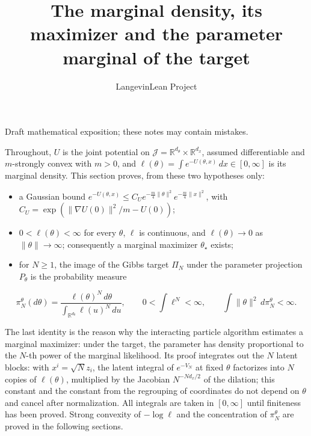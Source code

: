 \documentclass[11pt,a4paper]{article}
\title{\texorpdfstring{The marginal density, its maximizer and the parameter marginal of the target}{The marginal density, its maximizer and the parameter marginal of the target}}
\author{LangevinLean Project}
\date{}
\begin{document}
\maketitle
Draft mathematical exposition; these notes may contain mistakes.


Throughout, \(U\) is the joint potential on \(\mathcal J=\mathbb R^{d_\theta}\times\mathbb R^{d_x}\), assumed differentiable and \(m\)-strongly convex with \(m>0\), and \(\ell(\theta)=\int e^{-U(\theta,x)}\,dx\in[0,\infty]\) is its marginal density. This section proves, from these two hypotheses only:



\begin{itemize}


\item a Gaussian bound \(e^{-U(\theta,x)}\le C_Ue^{-\frac m4\|\theta\|^2}e^{-\frac m4\|x\|^2}\), with \(C_U=\exp(\|\nabla U(0)\|^2/m-U(0))\);

\item \(0<\ell(\theta)<\infty\) for every \(\theta\), \(\ell\) is continuous, and \(\ell(\theta)\to0\) as \(\|\theta\|\to\infty\); consequently a marginal maximizer \(\theta_\star\) exists;

\item for \(N\ge1\), the image of the Gibbs target \(\Pi_N\) under the parameter projection \(P_\theta\) is the probability measure

\end{itemize}

\[\pi_N^\theta(d\theta)=\frac{\ell(\theta)^N\,d\theta}{\int_{\mathbb R^{d_\theta}}\ell(u)^N\,du},\qquad0<\int\ell^N<\infty,\qquad\int\|\theta\|^2\,d\pi_N^\theta<\infty .\]


The last identity is the reason why the interacting particle algorithm estimates a marginal maximizer: under the target, the parameter has density proportional to the \(N\)-th power of the marginal likelihood. Its proof integrates out the \(N\) latent blocks: with \(x^i=\sqrt Nz_i\), the latent integral of \(e^{-V_N}\) at fixed \(\theta\) factorizes into \(N\) copies of \(\ell(\theta)\), multiplied by the Jacobian \(N^{-Nd_x/2}\) of the dilation; this constant and the constant from the regrouping of coordinates do not depend on \(\theta\) and cancel after normalization. All integrals are taken in \([0,\infty]\) until finiteness has been proved. Strong convexity of \(-\log\ell\) and the concentration of \(\pi_N^\theta\) are proved in the following sections.
\end{document}
